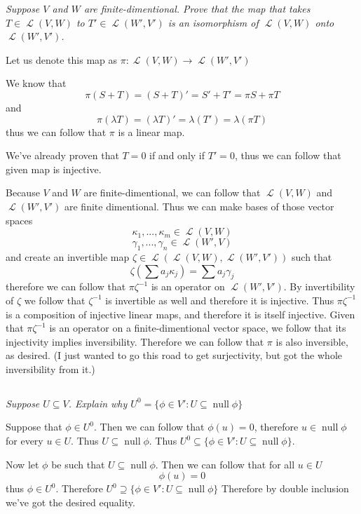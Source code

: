 \documentclass[11pt,oneside,titlepage]{book}
\DeclareMathOperator \map {\mathcal {L}}
\DeclareMathOperator \ns {null}
\begin{document}
\textit{Suppose $V$ and $W$ are finite-dimentional. Prove that the map that takes
  $T \in \map(V, W)$ to $T' \in \map(W', V')$ is an isomorphism of
  $\map(V, W)$ onto $\map(W', V')$.}

Let us denote this map as  $\pi: \map(V, W) \to \map(W', V')$

We know that
$$\pi(S + T) = (S + T)' = S' + T' = \pi S + \pi T$$
and
$$\pi(\lambda T) = (\lambda T)' = \lambda (T') = \lambda (\pi T)$$
thus we can follow that $\pi$ is a linear map.

We've already proven that $T = 0$ if and only if $T' = 0$, thus we can follow that
given map is injective.

Because $V$ and $W$ are finite-dimentional, we can follow that $\map(V, W)$ and $\map(W', V')$ are
finite dimentional. Thus we can make bases of those vector spaces
$$\kappa_1, ..., \kappa_m \in \map(V, W)$$
$$\gamma_1, ..., \gamma_n \in \map(W', V)$$
and create an invertible map $\zeta \in \map(\map(V, W) , \map(W', V'))$ such that
$$\zeta (\sum a_j \kappa_j) = \sum a_j \gamma_j$$
therefore we can follow that $\pi \zeta^{-1}$ is an operator on $\map(W', V')$. By invertibility
of $\zeta$ we follow that $\zeta^{-1}$ is invertible as well and therefore it is injective.
Thus $\pi \zeta^{-1}$ is a composition of injective linear maps, and therefore it is itself
injective. Given that $\pi \zeta^{-1}$ is an operator on a finite-dimentional vector space, we
follow that its injectivity implies inversibility. Therefore we can follow that $\pi$ is
also inversible, as desired. (I just wanted to go this road to get surjectivity, but got
the whole inversibility from it.)

\subsection{}

\textit{Suppose $U \subseteq V$. Explain why $U^0 = \{\phi \in V': U \subseteq \ns \phi\}$}

Suppose that $\phi \in U^0$. Then we can follow that $\phi(u) = 0$, therefore $u \in \ns \phi$
for every $u \in U$. Thus $U \subseteq \ns \phi$. Thus
$U^0 \subseteq \{\phi \in V': U \subseteq \ns \phi\}$.

Now let $\phi$ be such that $U \subseteq \ns \phi$. Then we can follow that for all
$u \in U$
$$\phi(u) = 0$$
thus $\phi \in U^0$. Therefore $U^0 \supseteq \{\phi \in V': U \subseteq \ns \phi\}$
Therefore by double inclusion we've got the desired equality.
\end{document}
